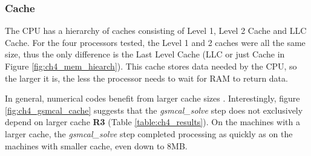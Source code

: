 \subsubsection{Cache}
The CPU has a hierarchy of caches consisting of Level 1, Level 2 Cache and LLC Cache. For the four processors tested, the Level 1 and 2 caches were all the same size, thus the only difference is the Last Level Cache (LLC or just Cache in Figure \ref{fig:ch4_mem_hiearch}). This cache stores data needed by the CPU, so the larger it is, the less the processor needs to wait for RAM to return data. 

In general, numerical codes benefit from larger cache sizes \citep{skadron1999branch,goto2008anatomy}. Interestingly,  figure \ref{fig:ch4_gsmcal_cache} suggests that the \textit{gsmcal\_solve} step does not exclusively depend on larger cache \textbf{R3} (Table \ref{table:ch4_results}). On the machines with a larger cache, the \textit{gsmcal\_solve} step completed processing as quickly as on the machines with smaller cache, even down to 8MB.  

